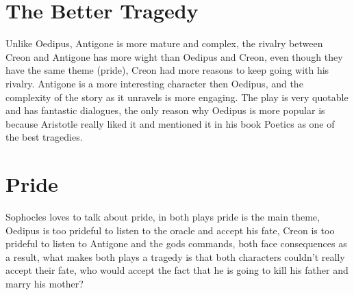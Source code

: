 \documentclass[12pt, a4paper]{article}
\begin{document}
\section*{The Better Tragedy}

{\fontpar
Unlike Oedipus, Antigone is more mature and complex, the rivalry between
Creon and Antigone has more wight than Oedipus and Creon, even though 
they have the same theme (pride), Creon had more reasons to keep going
with his rivalry. Antigone is a more interesting character then Oedipus,
and the complexity of the story as it unravels is more engaging. The play
is very quotable and has fantastic dialogues, the only reason why Oedipus is more popular is because Aristotle really liked
it and mentioned it in his book Poetics as one of the best tragedies.

}

\section*{Pride}

{\fontpar
Sophocles loves to talk about pride, in both plays pride is the main
theme, Oedipus is too prideful to listen to the oracle and accept his
fate, Creon is too prideful to listen to Antigone and the gods commands,
both face consequences as a result, what makes both plays a tragedy is
that both characters couldn't really accept their fate, who would accept
the fact that he is going to kill his father and marry his mother?

}
\end{document}
